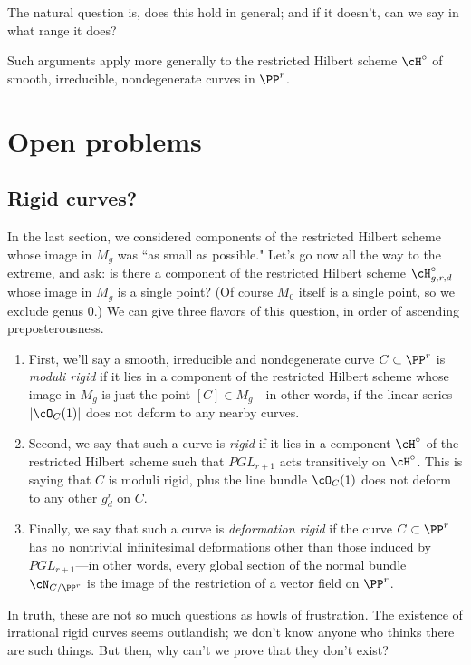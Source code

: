 The natural question is, does this hold in general; and if it doesn't, can we say in what range it does?

Such arguments apply more generally to the restricted Hilbert scheme $\cH^\circ$ of smooth, irreducible, nondegenerate curves in $\PP^r$. 

\section{Open problems}\label{open problems}


\subsection{Rigid curves?}

In the last section, we considered components of the restricted Hilbert scheme whose image in $M_g$ was ``as small as possible." Let's go now all the way to the extreme, and ask: is there a component of the restricted Hilbert scheme $\cH^\circ_{g,r,d}$ whose image in $M_g$ is a single point? (Of course $M_0$ itself is a single point, so we exclude genus 0.) We can give three flavors of this question, in order of ascending preposterousness.

\begin{enumerate} 
\item First, we'll say a smooth, irreducible and nondegenerate curve $C \subset \PP^r$ is \emph{moduli rigid} if it lies in a component of the restricted Hilbert scheme whose image in $M_g$ is just the point $[C] \in M_g$---in other words, if the linear series $|\cO_C(1)|$ does not deform to any nearby curves.

\item Second, we say that such a curve is \emph{rigid} if it lies in a component $\cH^\circ$ of the restricted Hilbert scheme such that $PGL_{r+1}$ acts transitively on $\cH^\circ$. This is saying that $C$ is moduli rigid, plus the line bundle $\cO_C(1)$ does not deform to any other $g^r_d$ on $C$.

\item Finally, we say that such a curve is \emph{deformation rigid} if the curve $C \subset \PP^r$ has no nontrivial infinitesimal deformations other than those induced by $PGL_{r+1}$---in other words, every global section of the normal bundle $\cN_{C/\PP^r}$ is the image of the restriction of a vector field on $\PP^r$.
\end{enumerate}

In truth, these are not so much questions as howls of frustration. The existence of irrational rigid curves seems outlandish; we don't know anyone who thinks there are such things. But then, why can't we prove that they don't exist?



